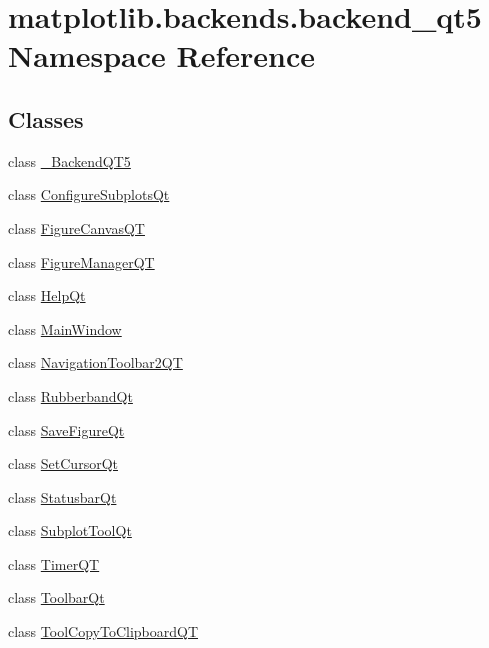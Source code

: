 \hypertarget{namespacematplotlib_1_1backends_1_1backend__qt5}{}\section{matplotlib.\+backends.\+backend\+\_\+qt5 Namespace Reference}
\label{namespacematplotlib_1_1backends_1_1backend__qt5}
\subsection*{Classes}
\begin{DoxyCompactItemize}
\item 
class \hyperlink{classmatplotlib_1_1backends_1_1backend__qt5_1_1__BackendQT5}{\+\_\+\+Backend\+Q\+T5}
\item 
class \hyperlink{classmatplotlib_1_1backends_1_1backend__qt5_1_1ConfigureSubplotsQt}{Configure\+Subplots\+Qt}
\item 
class \hyperlink{classmatplotlib_1_1backends_1_1backend__qt5_1_1FigureCanvasQT}{Figure\+Canvas\+QT}
\item 
class \hyperlink{classmatplotlib_1_1backends_1_1backend__qt5_1_1FigureManagerQT}{Figure\+Manager\+QT}
\item 
class \hyperlink{classmatplotlib_1_1backends_1_1backend__qt5_1_1HelpQt}{Help\+Qt}
\item 
class \hyperlink{classmatplotlib_1_1backends_1_1backend__qt5_1_1MainWindow}{Main\+Window}
\item 
class \hyperlink{classmatplotlib_1_1backends_1_1backend__qt5_1_1NavigationToolbar2QT}{Navigation\+Toolbar2\+QT}
\item 
class \hyperlink{classmatplotlib_1_1backends_1_1backend__qt5_1_1RubberbandQt}{Rubberband\+Qt}
\item 
class \hyperlink{classmatplotlib_1_1backends_1_1backend__qt5_1_1SaveFigureQt}{Save\+Figure\+Qt}
\item 
class \hyperlink{classmatplotlib_1_1backends_1_1backend__qt5_1_1SetCursorQt}{Set\+Cursor\+Qt}
\item 
class \hyperlink{classmatplotlib_1_1backends_1_1backend__qt5_1_1StatusbarQt}{Statusbar\+Qt}
\item 
class \hyperlink{classmatplotlib_1_1backends_1_1backend__qt5_1_1SubplotToolQt}{Subplot\+Tool\+Qt}
\item 
class \hyperlink{classmatplotlib_1_1backends_1_1backend__qt5_1_1TimerQT}{Timer\+QT}
\item 
class \hyperlink{classmatplotlib_1_1backends_1_1backend__qt5_1_1ToolbarQt}{Toolbar\+Qt}
\item 
class \hyperlink{classmatplotlib_1_1backends_1_1backend__qt5_1_1ToolCopyToClipboardQT}{Tool\+Copy\+To\+Clipboard\+QT}
\end{DoxyCompactItemize}
